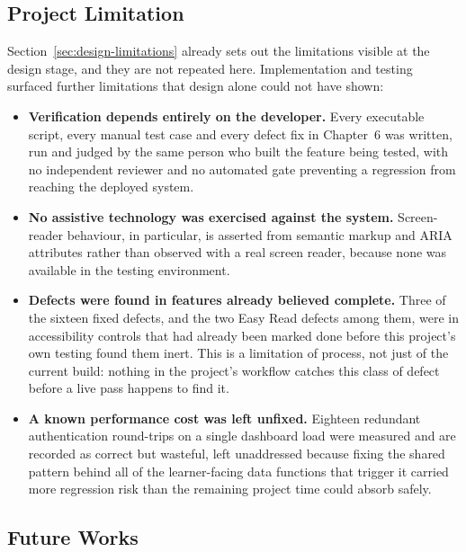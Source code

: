 \documentclass[12pt, oneside]{article} %
\begin{document}
\subsection{Project Limitation}

Section~\ref{sec:design-limitations} already sets out the limitations visible at the design stage, and they are not repeated here. Implementation and testing surfaced further limitations that design alone could not have shown:

\begin{itemize}
    \item \textbf{Verification depends entirely on the developer.} Every executable script, every manual test case and every defect fix in Chapter~6 was written, run and judged by the same person who built the feature being tested, with no independent reviewer and no automated gate preventing a regression from reaching the deployed system.
    \item \textbf{No assistive technology was exercised against the system.} Screen-reader behaviour, in particular, is asserted from semantic markup and ARIA attributes rather than observed with a real screen reader, because none was available in the testing environment.
    \item \textbf{Defects were found in features already believed complete.} Three of the sixteen fixed defects, and the two Easy Read defects among them, were in accessibility controls that had already been marked done before this project's own testing found them inert. This is a limitation of process, not just of the current build: nothing in the project's workflow catches this class of defect before a live pass happens to find it.
    \item \textbf{A known performance cost was left unfixed.} Eighteen redundant authentication round-trips on a single dashboard load were measured and are recorded as correct but wasteful, left unaddressed because fixing the shared pattern behind all of the learner-facing data functions that trigger it carried more regression risk than the remaining project time could absorb safely.
\end{itemize}

\subsection{Future Works}
\label{sec:future-works}
\end{document}

